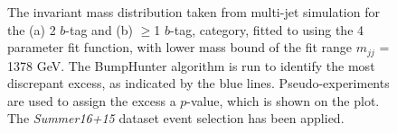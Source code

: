 \begin{figure}[!ht]
  \begin{center}
    \captionsetup[subfigure]{aboveskip=0pt,justification=centering}
  \end{center}
  \caption{ The invariant mass distribution taken from multi-jet simulation for the (a) 2 $b$-tag and (b) $\geq$1 $b$-tag,
    category, fitted to using the 4 parameter fit function, with lower mass bound of the fit range $m_{jj}$ = 1378 GeV.
    The BumpHunter algorithm is run to identify the most discrepant excess, as indicated by the blue lines.
    Pseudo-experiments are used to assign the excess a $p$-value, which is shown on the plot. 
    The \textit{Summer16+15} dataset event selection has been applied.}
  \label{fig:Short_4para_1378_figure1}
\end{figure}



